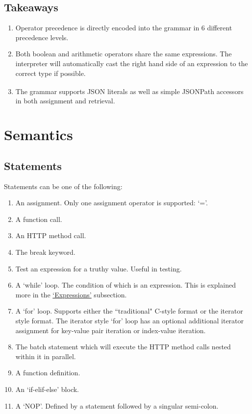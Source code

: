 \documentclass[]{interim}
\theoremstyle{definition}
\begin{document}
\subsection{Takeaways}

\begin{enumerate}
    \item Operator precedence is directly encoded into the grammar in 6 different precedence levels.
    \item Both boolean and arithmetic operators share the same expressions. The interpreter will automatically cast the right hand side of an expression to the correct type if possible.
    \item The grammar supports JSON literals as well as simple JSONPath\textsuperscript{\cite{goessner_2007}} accessors in both assignment and retrieval.
\end{enumerate}

\pagebreak

\section{Semantics}

\subsection{Statements}

Statements can be one of the following:

\begin{center}
    \begin{enumerate}
        \item An assignment. Only one assignment operator is supported: `='.
        \item A function call.
        \item An HTTP method call.
        \item The break keyword.
        \item Test an expression for a truthy value. Useful in testing.
        \item A `while' loop. The condition of which is an expression. This is explained more in the \hyperref[sec:expressions]{`Expressions'} subsection.
        \item A `for' loop. Supports either the ``traditional" C-style format or the iterator style format. The iterator style `for' loop has an optional additional iterator assignment for key-value pair iteration or index-value iteration.
        \item The batch statement which will execute the HTTP method calls nested within it in parallel.
        \item A function definition.
        \item An `if-elif-else' block.
        \item A `NOP'. Defined by a statement followed by a singular semi-colon.
    \end{enumerate}
\end{center}
\end{document}
